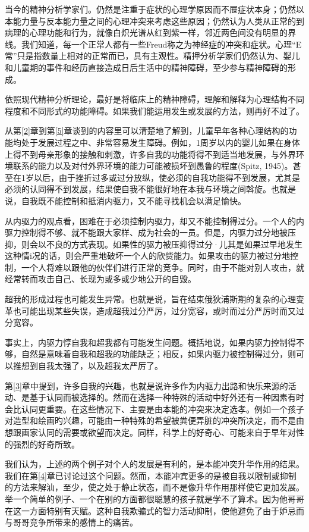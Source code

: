 \documentclass[UTF8,10pt,a4paper,openany]{book}
\begin{document}
当今的精神分析学家们。仍然是注重于症状的心理学原因而不屉症状本身；仍然以本能力量与反本能力量之间的心理冲突来考虑这些原因；仍然认为人类从正常的到病理的心理功能和行为，就像白炽光谱从红到紫一样，邻近两色间没有明显的界线。我们知道，每一个正常人都有一些Freud称之为神经症的冲突和症状。心理“E常”只是指数量上相对的正常而已，具有主观性。精押分析学家们仍然认为、婴儿和儿童期的事件和经历直接造成日后生活中的精神障碍，至少参与精神障碍的形成。

依照现代精神分析理论，最好是将临床上的精神障碍，理解和解释为心理结构不同程度和不同形式的功能障碍。如果我们能运用发生或发展的方法，则再好不过了。

从第\ref{2}章到第\ref{5}章谈到的内容里可以清楚地了解到，儿童早年各种心理结构的功能均处于发展过程之中、非常容易发生障碍。例如，1周岁以内的婴儿如果在身体上得不到母亲形象的接触和刺激，许多自我的功能将得不到适当地发展，与外界环境联系的能力以及对付外界环境的能力可能被损坏到愚鲁的程度(Spitz, 1945)。甚至在1岁以后，由于挫折过多或过分放纵，使必须的自我功能得不到发展，尤其是必须的认同得不到发展，结果使自我不能很好地在本我与环境之间斡旋。也就是说，自我既不能控制和抵消内驱力，又不能寻找机会以满足愉快。

从内驱力的观点看，困难在于必须控制内驱力，却又不能控制得过分。一个人的内驱力控制得不够、就不能跟大家样、成为社会的一员。但是，内驱力过分地被压抑，则会以不良的方式表现。如果性的驱力被压抑得过分·儿其是如果过早地发生这种情i况的话，则会严重地破坏一个人的欣赀能力。如果攻击的驱力被过分地控制，一个人将难以跟他的伙伴们进行正常的竞争。同时，由于不能对别人攻击，就经常转而攻击自己、长现为或多或少地公开的自毁。

超我的形成过程也可能发生异常。也就是说，旨在结束俄狄浦斯期的复杂的心理变革也可能出现某些失误，造成超我过分严厉，过分宽容，或时而过分严厉时而又过分宽容。

事实上，内驱力惇自我和超我都有可能发生问题。概括地说，如果内驱力控制得不够，自然是意味着自我和超我的功能缺乏；相反，如果内驱力被控制得过分，则可以推想到自我太强了，以及超我太严厉了。

第\ref{3}章中提到，许多自我的兴趣，也就是说许多作为内驱力出路和快乐来源的活动、是基于认同而被选择的。然而在选择一种特殊的活动中好外还有一种因素有时会比认同更重要。在这些情况下、主要是由本能的冲突来决定选孝。例如一个孩子对造型和绘画旳兴趣，可能由一种特殊的希望被粪便弄脏的冲突所决定，而不是由想跟画家认同的需要或欲望而决定。同样，科学上的好奇心、可能来自于早年对性的强烈的好奇所致。

我们认为，上述的两个例子对个人的发展是有利的，是本能冲突升华作用的结果。我们在第\ref{4}章已讨论过这个问题。然而，本能冲宾更多的是被自我以限制或抑制的方法来解汕，至少，使之处于静止状态，而不是像升华作用那样使它更加发展。举一个简单的例子、一个在别的方面都很聪慧的孩子就是学不了算术。因为他哥哥在这一方面特别有天赋。这种自我欺骗式的智力活动抑制，使他避免了由于妒忌而与哥哥竞争所带来的感情上的痛苦。
\end{document}
